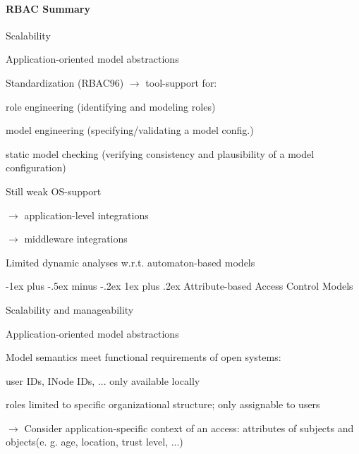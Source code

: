 \documentclass[a4paper]{article}
\makeatletter
\renewcommand{\subsubsection}{\@startsection{subsubsection}{3}{0mm}%
                {-1ex plus -.5ex minus -.2ex}%
                {1ex plus .2ex}%
                {\normalfont\small\bfseries}}
\makeatother
\begin{document}
\begin{multicols}{3}
    \paragraph{RBAC Summary}
    \begin{itemize*}
        \item Scalability
        \item Application-oriented model abstractions
        \item Standardization (RBAC96) $\rightarrow$ tool-support for:
        \begin{itemize*}
            \item role engineering (identifying and modeling roles)
            \item model engineering (specifying/validating a model config.)
            \item static model checking (verifying consistency and plausibility of a model configuration)
        \end{itemize*}
        \item Still weak OS-support
        \begin{itemize*}
            \item[$\rightarrow$] application-level integrations
            \item[$\rightarrow$] middleware integrations
        \end{itemize*}
        \item Limited dynamic analyses w.r.t. automaton-based models
    \end{itemize*}

    \subsubsection{Attribute-based Access Control Models}
    \begin{itemize*}
        \item Scalability and manageability
        \item Application-oriented model abstractions
        \item Model semantics meet functional requirements of open systems:
        \begin{itemize*}
            \item user IDs, INode IDs, ... only available locally
            \item roles limited to specific organizational structure; only assignable to users
        \end{itemize*}
        \item[$\rightarrow$] Consider application-specific context of an access: attributes of subjects and objects(e. g. age, location, trust level, ...)
    \end{itemize*}


\end{multicols}
\end{document}
